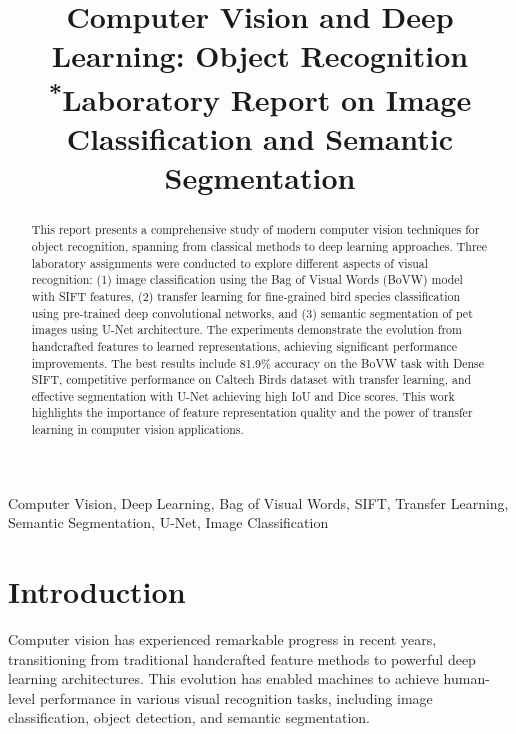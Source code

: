 \documentclass[conference]{IEEEtran}
\begin{document}
\title{Computer Vision and Deep Learning: Object Recognition\\
{\footnotesize \textsuperscript{*}Laboratory Report on Image Classification and Semantic Segmentation}
}

\author{
}

\maketitle

\begin{abstract}
This report presents a comprehensive study of modern computer vision techniques for object recognition, spanning from classical methods to deep learning approaches. Three laboratory assignments were conducted to explore different aspects of visual recognition: (1) image classification using the Bag of Visual Words (BoVW) model with SIFT features, (2) transfer learning for fine-grained bird species classification using pre-trained deep convolutional networks, and (3) semantic segmentation of pet images using U-Net architecture. The experiments demonstrate the evolution from handcrafted features to learned representations, achieving significant performance improvements. The best results include 81.9\% accuracy on the BoVW task with Dense SIFT, competitive performance on Caltech Birds dataset with transfer learning, and effective segmentation with U-Net achieving high IoU and Dice scores. This work highlights the importance of feature representation quality and the power of transfer learning in computer vision applications.
\end{abstract}

\begin{IEEEkeywords}
Computer Vision, Deep Learning, Bag of Visual Words, SIFT, Transfer Learning, Semantic Segmentation, U-Net, Image Classification
\end{IEEEkeywords}

\section{Introduction}

Computer vision has experienced remarkable progress in recent years, transitioning from traditional handcrafted feature methods to powerful deep learning architectures. This evolution has enabled machines to achieve human-level performance in various visual recognition tasks, including image classification, object detection, and semantic segmentation.
\end{document}
